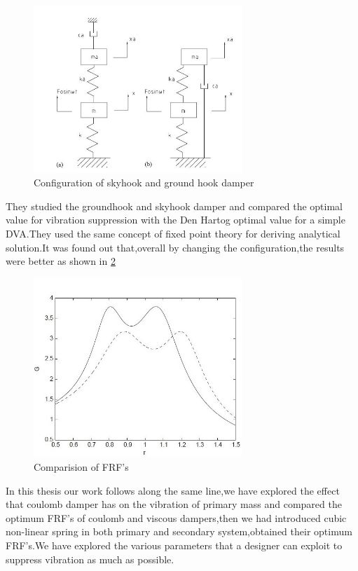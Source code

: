 \begin{enumerate}[i)]
\begin{figure}[h!]
\centering
\includegraphics[width=0.7\textwidth,height=0.5\textwidth]{"figures/8"}
\caption{Configuration of skyhook and ground hook damper}
  \label{fig:8}
\end{figure}
They studied the groundhook and skyhook damper and compared the optimal value for vibration suppression with the Den Hartog optimal value for a simple DVA.They used the same concept of fixed point theory for deriving analytical solution.It was found out that,overall by changing the configuration,the results were better as shown in \ref{fig:9}
\begin{figure}[h!]
\includegraphics[width=0.7\textwidth,height=0.4\textwidth]{"figures/9"}
\centering
\caption{Comparision of FRF's}
  \label{fig:9}
\end{figure}
  In this thesis our work follows along the same line,we have explored the effect that coulomb damper has on the vibration of primary mass and compared the optimum FRF's of coulomb and viscous dampers,then we had introduced cubic non-linear spring in both primary and secondary system,obtained their optimum FRF's.We have explored the various parameters that a designer can exploit to suppress vibration as much as possible.

\end{enumerate}
